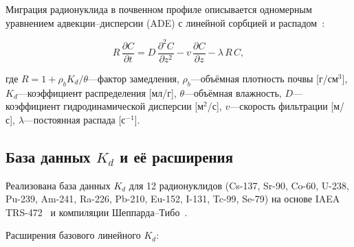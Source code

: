 \documentclass[12pt,a4paper]{article}
\begin{document}
Миграция радионуклида в почвенном профиле описывается одномерным
уравнением адвекции--дисперсии (ADE) с линейной сорбцией и распадом~\citep{IAEA2010, vanGenuchten1981}:

\begin{equation}
  R\,\frac{\partial C}{\partial t} =
  D\,\frac{\partial^2 C}{\partial z^2} - v\,\frac{\partial C}{\partial z}
  - \lambda\, R\, C,
  \label{eq:ade}
\end{equation}

где $R = 1 + \rho_b K_d / \theta$---фактор замедления,
$\rho_b$---объёмная плотность почвы [г/см$^3$],
$K_d$---коэффициент распределения [мл/г],
$\theta$---объёмная влажность,
$D$---коэффициент гидродинамической дисперсии [м$^2$/с],
$v$---скорость фильтрации [м/с],
$\lambda$---постоянная распада [с$^{-1}$].

\subsection{База данных $K_d$ и её расширения}
\label{sub:kd}

Реализована база данных $K_d$ для 12 радионуклидов
(Cs-137, Sr-90, Co-60, U-238, Pu-239, Am-241, Ra-226, Pb-210,
Eu-152, I-131, Tc-99, Se-79) на основе IAEA TRS-472~\citep{IAEA2010}
и компиляции Шеппарда--Тибо~\citep{Sheppard1990}.

Расширения базового линейного $K_d$:
\end{document}
